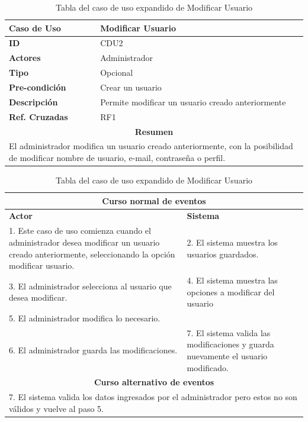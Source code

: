 \clearpage
\begin{table}
	\centering
	\begin{tabular}{|p{6cm} |p{6cm}|}
		\hline \textbf{Caso de Uso} & Modificar Usuario \\ 
		\hline \textbf{ID} & CDU2 \\ 
		\hline \textbf{Actores} & Administrador \\ 
		\hline \textbf{Tipo} & Opcional \\ 
		\hline \textbf{Pre-condición} & Crear un usuario \\ 
		\hline \textbf{Descripción} & Permite modificar un usuario creado anteriormente \\
		\hline \textbf{Ref. Cruzadas} & RF1 \\ 
		\hline
		\multicolumn{2}{|c|}{\textbf{Resumen}} \\
		\hline
		\multicolumn{2}{|p{12cm}|}{El administrador modifica un usuario creado anteriormente, con la posibilidad de modificar nombre de usuario, e-mail, contraseña o perfil.} \\
		\hline 
	\end{tabular}  
	
	
	\begin{tabular}{|p{6cm}|p{6cm}|}
		
		\multicolumn{2}{|c|}{\textbf{Curso normal de eventos}} \\
		\hline \textbf{Actor} & \textbf{Sistema} \\ 
		\hline 1. Este caso de uso comienza cuando el administrador desea modificar un usuario creado anteriormente, seleccionando la opción modificar usuario. & 2. El sistema muestra los usuarios guardados. \\ 
		3. El administrador selecciona al usuario que desea modificar. & 4. El sistema muestra las opciones a modificar del usuario  \\
		5. El administrador modifica lo necesario. &  \\
		6. El administrador guarda las modificaciones. & 7. El sistema valida las modificaciones y guarda nuevamente el usuario modificado. \\
		\hline
		\multicolumn{2}{|c|}{\textbf{Curso alternativo de eventos}} \\
		\hline
		\multicolumn{2}{|p{12cm}|}{7. El sistema valida los datos ingresados por el administrador pero estos no son válidos y vuelve al paso 5. } \\
		\hline
	\end{tabular}
	\caption{Tabla del caso de uso expandido de Modificar Usuario}
	\label{tabcdu2}
\end{table}

